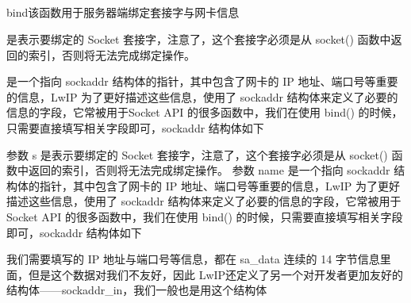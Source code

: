 \documentclass[a4paper,12pt,english]{sphinxmanual}
\begin{document}
{{\subparagraph{}
\label{\detokenize{exp-esp32/socket/tcp:bind}}
\sphinxAtStartPar
bind该函数用于服务器端绑定套接字与网卡信息

\begin{sphinxVerbatim}[commandchars=\\\{\}]
\end{sphinxVerbatim}

\sphinxAtStartPar
{} 是表示要绑定的 Socket 套接字，注意了，这个套接字必须是从 socket() 函数中返回的索引，否则将无法完成绑定操作。

\sphinxAtStartPar
{} 是一个指向 sockaddr 结构体的指针，其中包含了网卡的 IP 地址、端口号等重要的信息，LwIP 为了更好描述这些信息，使用了 sockaddr 结构体来定义了必要的信息的字段，它常被用于Socket API 的很多函数中，我们在使用 bind() 的时候，只需要直接填写相关字段即可，sockaddr 结构体如下

\sphinxAtStartPar
参数 s 是表示要绑定的 Socket 套接字，注意了，这个套接字必须是从 socket() 函数中返回的索引，否则将无法完成绑定操作。
参数 name 是一个指向 sockaddr 结构体的指针，其中包含了网卡的 IP 地址、端口号等重要的信息，LwIP 为了更好描述这些信息，使用了 sockaddr 结构体来定义了必要的信息的字段，它常被用于Socket API 的很多函数中，我们在使用 bind() 的时候，只需要直接填写相关字段即可，sockaddr 结构体如下

\begin{sphinxVerbatim}[commandchars=\\\{\}]
\PYG{p}{[}\PYG{p}{]}
\end{sphinxVerbatim}

\sphinxAtStartPar
我们需要填写的 IP 地址与端口号等信息，都在 sa\_data 连续的 14 字节信息里面，但是这个数据对我们不友好，因此 LwIP还定义了另一个对开发者更加友好的结构体——sockaddr\_in，我们一般也是用这个结构体

}}
\end{document}
